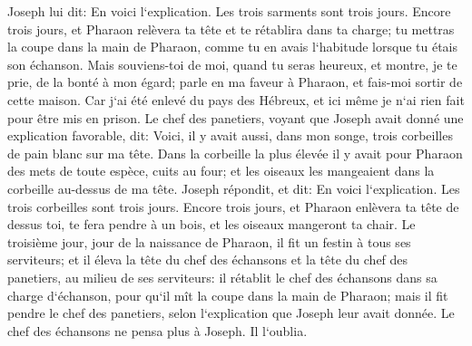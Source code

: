 \verse Joseph lui dit: En voici l`explication. Les trois sarments sont trois jours. 
\verse Encore trois jours, et Pharaon relèvera ta tête et te rétablira dans ta charge; tu mettras la coupe dans la main de Pharaon, comme tu en avais l`habitude lorsque tu étais son échanson. 
\verse Mais souviens-toi de moi, quand tu seras heureux, et montre, je te prie, de la bonté à mon égard; parle en ma faveur à Pharaon, et fais-moi sortir de cette maison. 
\verse Car j`ai été enlevé du pays des Hébreux, et ici même je n`ai rien fait pour être mis en prison. 
\verse Le chef des panetiers, voyant que Joseph avait donné une explication favorable, dit: Voici, il y avait aussi, dans mon songe, trois corbeilles de pain blanc sur ma tête. 
\verse Dans la corbeille la plus élevée il y avait pour Pharaon des mets de toute espèce, cuits au four; et les oiseaux les mangeaient dans la corbeille au-dessus de ma tête. 
\verse Joseph répondit, et dit: En voici l`explication. Les trois corbeilles sont trois jours. 
\verse Encore trois jours, et Pharaon enlèvera ta tête de dessus toi, te fera pendre à un bois, et les oiseaux mangeront ta chair. 
\verse Le troisième jour, jour de la naissance de Pharaon, il fit un festin à tous ses serviteurs; et il éleva la tête du chef des échansons et la tête du chef des panetiers, au milieu de ses serviteurs: 
\verse il rétablit le chef des échansons dans sa charge d`échanson, pour qu`il mît la coupe dans la main de Pharaon; 
\verse mais il fit pendre le chef des panetiers, selon l`explication que Joseph leur avait donnée. 
\verse Le chef des échansons ne pensa plus à Joseph. Il l`oublia. 

